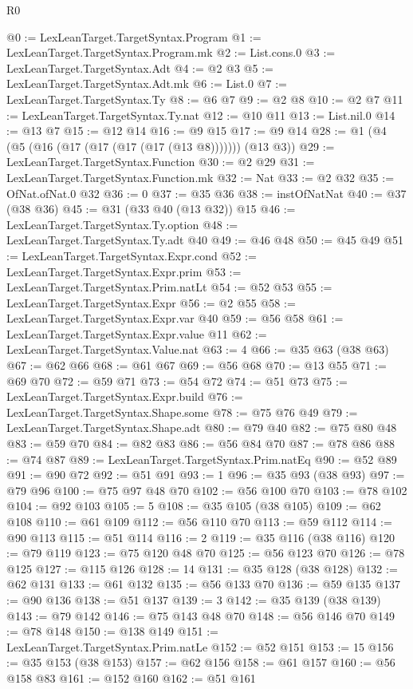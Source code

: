 \begin{lexlean}{R0}
\begin{coremodule}
@0 := LexLeanTarget.TargetSyntax.Program
@1 := LexLeanTarget.TargetSyntax.Program.mk
@2 := List.cons.{0}
@3 := LexLeanTarget.TargetSyntax.Adt
@4 := @2 @3
@5 := LexLeanTarget.TargetSyntax.Adt.mk
@6 := List.{0}
@7 := LexLeanTarget.TargetSyntax.Ty
@8 := @6 @7
@9 := @2 @8
@10 := @2 @7
@11 := LexLeanTarget.TargetSyntax.Ty.nat
@12 := @10 @11
@13 := List.nil.{0}
@14 := @13 @7
@15 := @12 @14
@16 := @9 @15
@17 := @9 @14
@28 := @1 (@4 (@5 (@16 (@17 (@17 (@17 (@17 (@13 @8))))))) (@13 @3))
@29 := LexLeanTarget.TargetSyntax.Function
@30 := @2 @29
@31 := LexLeanTarget.TargetSyntax.Function.mk
@32 := Nat
@33 := @2 @32
@35 := OfNat.ofNat.{0} @32
@36 := 0
@37 := @35 @36
@38 := instOfNatNat
@40 := @37 (@38 @36)
@45 := @31 (@33 @40 (@13 @32)) @15
@46 := LexLeanTarget.TargetSyntax.Ty.option
@48 := LexLeanTarget.TargetSyntax.Ty.adt @40
@49 := @46 @48
@50 := @45 @49
@51 := LexLeanTarget.TargetSyntax.Expr.cond
@52 := LexLeanTarget.TargetSyntax.Expr.prim
@53 := LexLeanTarget.TargetSyntax.Prim.natLt
@54 := @52 @53
@55 := LexLeanTarget.TargetSyntax.Expr
@56 := @2 @55
@58 := LexLeanTarget.TargetSyntax.Expr.var @40
@59 := @56 @58
@61 := LexLeanTarget.TargetSyntax.Expr.value @11
@62 := LexLeanTarget.TargetSyntax.Value.nat
@63 := 4
@66 := @35 @63 (@38 @63)
@67 := @62 @66
@68 := @61 @67
@69 := @56 @68
@70 := @13 @55
@71 := @69 @70
@72 := @59 @71
@73 := @54 @72
@74 := @51 @73
@75 := LexLeanTarget.TargetSyntax.Expr.build
@76 := LexLeanTarget.TargetSyntax.Shape.some
@78 := @75 @76 @49
@79 := LexLeanTarget.TargetSyntax.Shape.adt
@80 := @79 @40
@82 := @75 @80 @48
@83 := @59 @70
@84 := @82 @83
@86 := @56 @84 @70
@87 := @78 @86
@88 := @74 @87
@89 := LexLeanTarget.TargetSyntax.Prim.natEq
@90 := @52 @89
@91 := @90 @72
@92 := @51 @91
@93 := 1
@96 := @35 @93 (@38 @93)
@97 := @79 @96
@100 := @75 @97 @48 @70
@102 := @56 @100 @70
@103 := @78 @102
@104 := @92 @103
@105 := 5
@108 := @35 @105 (@38 @105)
@109 := @62 @108
@110 := @61 @109
@112 := @56 @110 @70
@113 := @59 @112
@114 := @90 @113
@115 := @51 @114
@116 := 2
@119 := @35 @116 (@38 @116)
@120 := @79 @119
@123 := @75 @120 @48 @70
@125 := @56 @123 @70
@126 := @78 @125
@127 := @115 @126
@128 := 14
@131 := @35 @128 (@38 @128)
@132 := @62 @131
@133 := @61 @132
@135 := @56 @133 @70
@136 := @59 @135
@137 := @90 @136
@138 := @51 @137
@139 := 3
@142 := @35 @139 (@38 @139)
@143 := @79 @142
@146 := @75 @143 @48 @70
@148 := @56 @146 @70
@149 := @78 @148
@150 := @138 @149
@151 := LexLeanTarget.TargetSyntax.Prim.natLe
@152 := @52 @151
@153 := 15
@156 := @35 @153 (@38 @153)
@157 := @62 @156
@158 := @61 @157
@160 := @56 @158 @83
@161 := @152 @160
@162 := @51 @161

\end{coremodule}
\end{lexlean}
